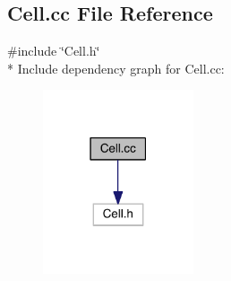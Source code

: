 \hypertarget{a00002}{}\subsection{Cell.\+cc File Reference}
\label{a00002}
{\ttfamily \#include \char`\"{}Cell.\+h\char`\"{}}\\*
Include dependency graph for Cell.\+cc\+:
\nopagebreak
\begin{figure}[H]
\begin{center}
\leavevmode
\includegraphics[width=126pt]{a00012}
\end{center}
\end{figure}
